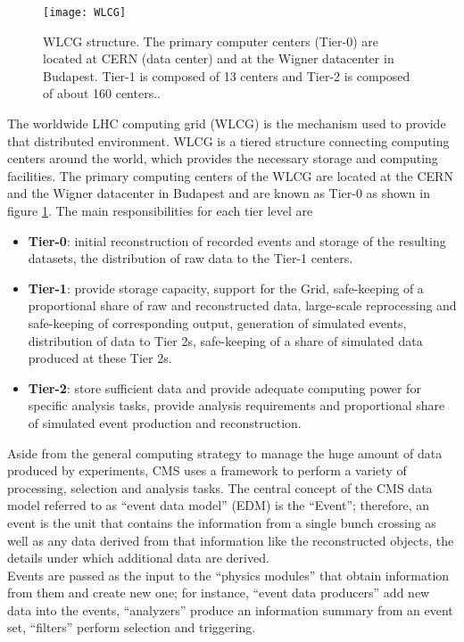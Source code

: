 \begin{figure}[h!]
  \centering
  \texttt{[image: WLCG]}
  \caption[WLCG structure]{WLCG structure. The primary computer centers (Tier-0) are located at CERN (data center) and at the Wigner datacenter in Budapest. Tier-1 is composed of 13 centers and Tier-2 is composed of about 160 centers.\cite{wlcg}. }
  \label{fig:wlcg}
\end{figure}

\noindent The worldwide LHC computing grid (WLCG) is the mechanism used to provide that distributed environment. WLCG is a tiered structure connecting computing centers around the world, which provides the necessary storage and computing facilities. The primary computing centers of the WLCG are located at the CERN and the Wigner datacenter in Budapest and are known as Tier-0 as shown in figure \ref{fig:wlcg}. The main responsibilities for each tier level are\cite{wlcg}

\begin{itemize}
\item \textbf{Tier-0}: initial reconstruction of recorded events and storage of the resulting datasets, the distribution of raw data to the Tier-1 centers.
\item \textbf{Tier-1}: provide storage capacity, support for the Grid, safe-keeping of a proportional share of raw and reconstructed data, large-scale reprocessing and safe-keeping of corresponding output, generation of simulated events, distribution of data to Tier 2s, safe-keeping of a share of simulated data produced at these Tier 2s.
\item \textbf{Tier-2}: store sufficient data and provide adequate computing power for specific analysis tasks, provide analysis requirements and proportional share of simulated event production and reconstruction.
\end{itemize}

\noindent Aside from the general computing strategy to manage the huge amount of data produced by experiments, CMS uses a framework to perform a variety of processing, selection and analysis tasks. The central concept of the CMS data model referred to as ``event data model'' (EDM) is the ``Event''; therefore, an event is the unit that contains the information from a single bunch crossing as well as any data derived from that information like the reconstructed objects, the details under which additional data are derived.\\

\noindent Events are passed as the input to the ``physics modules'' that obtain information from them and create new one; for instance, ``event data producers'' add new data into the events, ``analyzers'' produce an information summary from an event set, ``filters'' perform selection and triggering.\\

